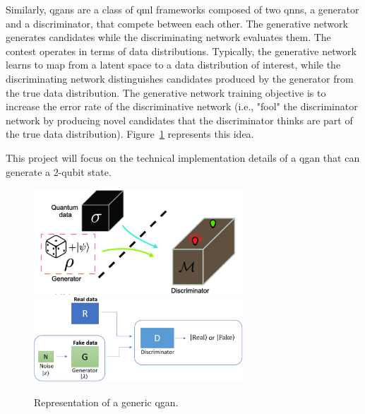 Similarly, \glspl{qgan} are a class of \gls{qml} frameworks composed of two 
\glspl{qnn}, a generator and a discriminator, that compete between each other. 
The generative network generates candidates while the discriminating network
evaluates them. The contest operates in terms of data distributions. Typically, 
the generative network learns to map from a latent space to a data distribution 
of interest, while the discriminating network distinguishes candidates produced 
by the generator from the true data distribution. The generative network training
objective is to increase the error rate of the discriminative network (i.e., 
"fool" the discriminator network by producing novel candidates that the
discriminator thinks are part of the true data distribution). 
Figure~\ref{fig:qgan_generic} represents this idea.

This project will focus on the technical implementation details of a \gls{qgan} 
that can generate a 2-qubit state.

\begin{figure}[!htbp]
\centering
	\includegraphics[width=0.70\textwidth]{figures/qgan_generic.pdf} \\
	\includegraphics[width=0.70\textwidth]{figures/qgan_generic2.pdf}
\caption{Representation of a generic \gls{qgan}.}
\label{fig:qgan_generic}
\end{figure}